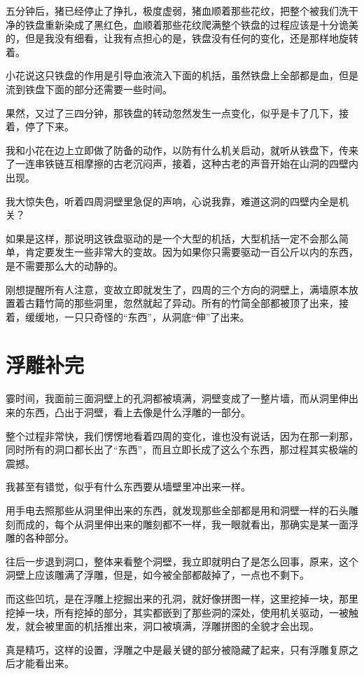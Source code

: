 五分钟后，猪已经停止了挣扎，极度虚弱，猪血顺着那些花纹，把整个被我们洗干净的铁盘重新染成了黑红色，血顺着那些花纹爬满整个铁盘的过程应该是十分诡美的，但是我没有细看，让我有点担心的是，铁盘没有任何的变化，还是那样地旋转着。

小花说这只铁盘的作用是引导血液流入下面的机括，虽然铁盘上全部都是血，但是流到铁盘下面的部分还需要一些时间。

果然，又过了三四分钟，那铁盘的转动忽然发生一点变化，似乎是卡了几下，接着，停了下来。

我和小花在边上立即做了防备的动作，以防有什么机关启动，就听从铁盘下，传来了一连串铁链互相摩擦的古老沉闷声，接着，这种古老的声音开始在山洞的四壁内出现。

我大惊失色，听着四周洞壁里急促的声响，心说我靠，难道这洞的四壁内全是机关？

如果是这样，那说明这铁盘驱动的是一个大型的机括，大型机括一定不会那么简单，肯定要发生一些非常大的变故。因为如果你只需要驱动一百公斤以内的东西，是不需要那么大的动静的。

刚想提醒所有人注意，变故立即就发生了，四周的三个方向的洞壁上，满墙原本放置着古籍竹简的那些洞里，忽然就起了异动。所有的竹简全部都被顶了出来，接着，缓缓地，一只只奇怪的“东西”，从洞底“伸”了出来。

\chapter{浮雕补完}

霎时间，我面前三面洞壁上的孔洞都被填满，洞壁变成了一整片墙，而从洞里伸出来的东西，凸出于洞壁，看上去像是什么浮雕的一部分。

整个过程非常快，我们愣愣地看着四周的变化，谁也没有说话，因为在那一刹那，同时所有的洞口都长出了“东西”，而且立即长成了这么个东西，那过程其实极端的震撼。

我甚至有错觉，似乎有什么东西要从墙壁里冲出来一样。

用手电去照那些从洞里伸出来的东西，就发现那些全部都是用和洞壁一样的石头雕刻而成的，每个从洞里伸出来的雕刻都不一样，我一眼就看出，那确实是某一面浮雕的各种部分。

往后一步退到洞口，整体来看整个洞壁，我立即就明白了是怎么回事，原来，这个洞壁上应该雕满了浮雕，但是，如今被全部都敲掉了，一点也不剩下。

而这些凹坑，是在浮雕上挖掘出来的孔洞，就好像拼图一样，这里挖掉一块，那里挖掉一块，所有挖掉的部分，其实都嵌到了那些洞的深处，使用机关驱动，一被触发，就会被里面的机括推出来，洞口被填满，浮雕拼图的全貌才会出现。

真是精巧，这样的设置，浮雕之中是最关键的部分被隐藏了起来，只有浮雕复原之后才能看出来。

